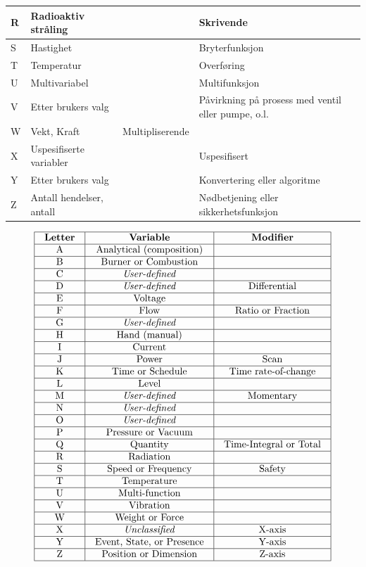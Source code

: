 \begin{center}
\begin{tabular}{ | m{1.5cm} | m{4.5cm}| m{4.5cm} | m{4.5cm} |}
	\hline
	R&Radioaktiv stråling&&Skrivende\\
	\hline
	S&Hastighet&&Bryterfunksjon\\
	\hline
	T&Temperatur&&Overføring\\
	\hline
	U&Multivariabel&&Multifunksjon\\
	\hline
	V&Etter brukers valg&&Påvirkning på prosess med ventil eller pumpe, o.l.\\
	\hline
	W&Vekt, Kraft&Multipliserende&\\
	\hline
	X&Uspesifiserte variabler&&Uspesifisert\\
	\hline
	Y&Etter brukers valg&&Konvertering eller algoritme\\
	\hline
	Z&Antall hendelser, antall&&Nødbetjening eller sikkerhetsfunksjon\\
\hline
\end{tabular}
\end{center}
$$\vbox{\offinterlineskip
\halign{\strut
\vrule \quad\hfil # \ \hfil & 
\vrule \quad\hfil # \ \hfil & 
\vrule \quad\hfil # \ \hfil \vrule \cr
\noalign{\hrule}
%
\textbf{Letter} & \textbf{Variable} & \textbf{Modifier} \cr
%
\noalign{\hrule}
%
A & Analytical (composition) & \cr
%
\noalign{\hrule}
%
B & Burner or Combustion &  \cr
%
\noalign{\hrule}
%
C & \textit{User-defined} &  \cr
%
\noalign{\hrule}
%
D & \textit{User-defined} & Differential \cr
%
\noalign{\hrule}
%
E & Voltage &  \cr
%
\noalign{\hrule}
%
F & Flow & Ratio or Fraction \cr
%
\noalign{\hrule}
%
G & \textit{User-defined} &  \cr
%
\noalign{\hrule}
%
H & Hand (manual) &  \cr
%
\noalign{\hrule}
%
I & Current &  \cr
%
\noalign{\hrule}
%
J & Power & Scan \cr
%
\noalign{\hrule}
%
K & Time or Schedule & Time rate-of-change \cr
%
\noalign{\hrule}
%
L & Level &  \cr
%
\noalign{\hrule}
%
M & \textit{User-defined} & Momentary \cr
%
\noalign{\hrule}
%
N & \textit{User-defined} &  \cr
%
\noalign{\hrule}
%
O & \textit{User-defined} &  \cr
%
\noalign{\hrule}
%
P & Pressure or Vacuum &  \cr
%
\noalign{\hrule}
%
Q & Quantity & Time-Integral or Total \cr
%
\noalign{\hrule}
%
R & Radiation &  \cr
%
\noalign{\hrule}
%
S & Speed or Frequency & Safety \cr
%
\noalign{\hrule}
%
T & Temperature &  \cr
%
\noalign{\hrule}
%
U & Multi-function &  \cr
%
\noalign{\hrule}
%
V & Vibration &  \cr
%
\noalign{\hrule}
%
W & Weight or Force &  \cr
%
\noalign{\hrule}
%
X & \textit{Unclassified} & X-axis \cr
%
\noalign{\hrule}
%
Y & Event, State, or Presence & Y-axis \cr
%
\noalign{\hrule}
%
Z & Position or Dimension & Z-axis \cr
%
\noalign{\hrule}
} %
}$$ %

